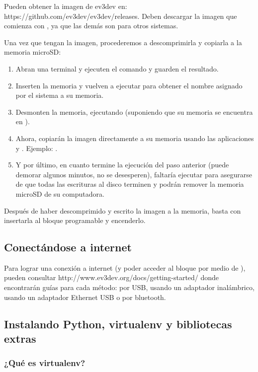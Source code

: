 \noindent Pueden obtener la imagen de ev3dev en: https://github.com/ev3dev/ev3dev/releases. Deben descargar la imagen que comienza con , ya que las demás son para otros sistemas.

Una vez que tengan la imagen, procederemos a descomprimirla y copiarla a la memoria microSD:

\begin{enumerate}
  \item Abran una terminal y ejecuten el comando  y guarden el resultado.
  \item Inserten la memoria y vuelven a ejecutar  para obtener el nombre asignado por el sistema a su memoria.
  \item Desmonten la memoria, ejecutando  (suponiendo que su memoria se encuentra en  ).
  \item Ahora, copiarán la imagen directamente a su memoria usando las aplicaciones  y . Ejemplo: .
  \item Y por último, en cuanto termine la ejecución del paso anterior (puede demorar algunos minutos, no se desesperen), faltaría ejecutar  para asegurarse de que todas las escrituras al disco terminen y podrán remover la memoria microSD de su computadora.
\end{enumerate}


Después de haber descomprimido y escrito la imagen a la memoria, basta con insertarla al bloque programable y encenderlo.


\subsection{Conectándose a internet}

Para lograr una conexión a internet (y poder acceder al bloque por medio de ), pueden consultar http://www.ev3dev.org/docs/getting-started/ donde encontrarán guías para cada método: por USB, usando un adaptador inalámbrico, usando un adaptador Ethernet USB o por bluetooth.


\subsection{Instalando Python, virtualenv y bibliotecas extras}

\subsubsection{¿Qué es virtualenv?}

